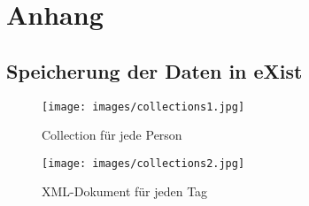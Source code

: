 \appendix

\section{Anhang}
\subsection{Speicherung der Daten in eXist}
\begin{figure}[H]
	\centering
		\texttt{[image: images/collections1.jpg]}
		\caption{Collection für jede Person} 
		\label{collection1}
	\centering
\end{figure}
\begin{figure}[H]
	\centering
		\texttt{[image: images/collections2.jpg]}
		\caption{XML-Dokument für jeden Tag} 
		\label{collection2}
	\centering
\end{figure}
